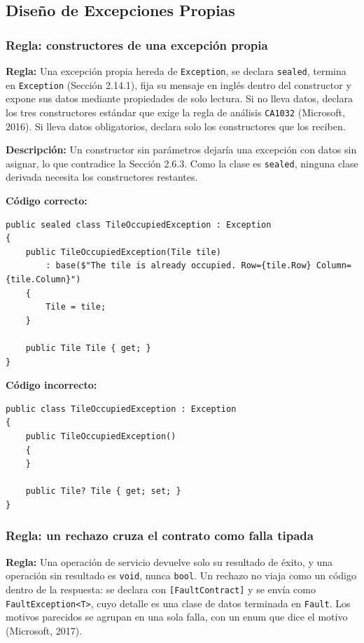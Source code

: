 \subsection{Diseño de Excepciones Propias}

\subsubsection{Regla: constructores de una excepción propia}

\textbf{Regla:} Una excepción propia hereda de \texttt{Exception}, se declara \texttt{sealed}, termina en \texttt{Exception} (Sección 2.14.1), fija su mensaje en inglés dentro del constructor y expone sus datos mediante propiedades de solo lectura. Si no lleva datos, declara los tres constructores estándar que exige la regla de análisis \texttt{CA1032} (Microsoft, 2016). Si lleva datos obligatorios, declara solo los constructores que los reciben.

\textbf{Descripción:} Un constructor sin parámetros dejaría una excepción con datos sin asignar, lo que contradice la Sección 2.6.3. Como la clase es \texttt{sealed}, ninguna clase derivada necesita los constructores restantes.

\textbf{Código correcto:}
\begin{lstlisting}[style=csharpstyle]
public sealed class TileOccupiedException : Exception
{
    public TileOccupiedException(Tile tile)
        : base($"The tile is already occupied. Row={tile.Row} Column={tile.Column}")
    {
        Tile = tile;
    }

    public Tile Tile { get; }
}
\end{lstlisting}

\textbf{Código incorrecto:}
\begin{lstlisting}[style=csharpstyle]
public class TileOccupiedException : Exception
{
    public TileOccupiedException()
    {
    }

    public Tile? Tile { get; set; }
}
\end{lstlisting}

\subsubsection{Regla: un rechazo cruza el contrato como falla tipada}

\textbf{Regla:} Una operación de servicio devuelve solo su resultado de éxito, y una operación sin resultado es \texttt{void}, nunca \texttt{bool}. Un rechazo no viaja como un código dentro de la respuesta: se declara con \texttt{[FaultContract]} y se envía como \texttt{FaultException<T>}, cuyo detalle es una clase de datos terminada en \texttt{Fault}. Los motivos parecidos se agrupan en una sola falla, con un enum que dice el motivo (Microsoft, 2017).

